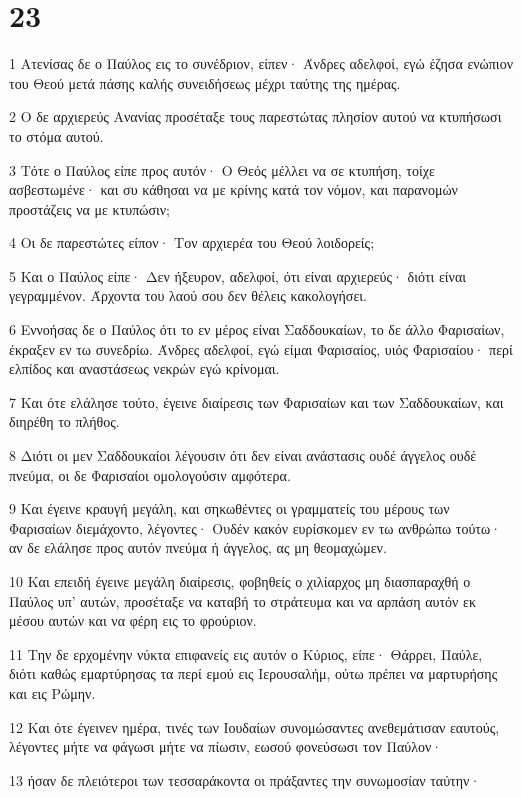 \chapter{23}

\par 1 Ατενίσας δε ο Παύλος εις το συνέδριον, είπεν· Άνδρες αδελφοί, εγώ έζησα ενώπιον του Θεού μετά πάσης καλής συνειδήσεως μέχρι ταύτης της ημέρας.
\par 2 Ο δε αρχιερεύς Ανανίας προσέταξε τους παρεστώτας πλησίον αυτού να κτυπήσωσι το στόμα αυτού.
\par 3 Τότε ο Παύλος είπε προς αυτόν· Ο Θεός μέλλει να σε κτυπήση, τοίχε ασβεστωμένε· και συ κάθησαι να με κρίνης κατά τον νόμον, και παρανομών προστάζεις να με κτυπώσιν;
\par 4 Οι δε παρεστώτες είπον· Τον αρχιερέα του Θεού λοιδορείς;
\par 5 Και ο Παύλος είπε· Δεν ήξευρον, αδελφοί, ότι είναι αρχιερεύς· διότι είναι γεγραμμένον. Άρχοντα του λαού σου δεν θέλεις κακολογήσει.
\par 6 Εννοήσας δε ο Παύλος ότι το εν μέρος είναι Σαδδουκαίων, το δε άλλο Φαρισαίων, έκραξεν εν τω συνεδρίω. Άνδρες αδελφοί, εγώ είμαι Φαρισαίος, υιός Φαρισαίου· περί ελπίδος και αναστάσεως νεκρών εγώ κρίνομαι.
\par 7 Και ότε ελάλησε τούτο, έγεινε διαίρεσις των Φαρισαίων και των Σαδδουκαίων, και διηρέθη το πλήθος.
\par 8 Διότι οι μεν Σαδδουκαίοι λέγουσιν ότι δεν είναι ανάστασις ουδέ άγγελος ουδέ πνεύμα, οι δε Φαρισαίοι ομολογούσιν αμφότερα.
\par 9 Και έγεινε κραυγή μεγάλη, και σηκωθέντες οι γραμματείς του μέρους των Φαρισαίων διεμάχοντο, λέγοντες· Ουδέν κακόν ευρίσκομεν εν τω ανθρώπω τούτω· αν δε ελάλησε προς αυτόν πνεύμα ή άγγελος, ας μη θεομαχώμεν.
\par 10 Και επειδή έγεινε μεγάλη διαίρεσις, φοβηθείς ο χιλίαρχος μη διασπαραχθή ο Παύλος υπ' αυτών, προσέταξε να καταβή το στράτευμα και να αρπάση αυτόν εκ μέσου αυτών και να φέρη εις το φρούριον.
\par 11 Την δε ερχομένην νύκτα επιφανείς εις αυτόν ο Κύριος, είπε· Θάρρει, Παύλε, διότι καθώς εμαρτύρησας τα περί εμού εις Ιερουσαλήμ, ούτω πρέπει να μαρτυρήσης και εις Ρώμην.
\par 12 Και ότε έγεινεν ημέρα, τινές των Ιουδαίων συνομώσαντες ανεθεμάτισαν εαυτούς, λέγοντες μήτε να φάγωσι μήτε να πίωσιν, εωσού φονεύσωσι τον Παύλον·
\par 13 ήσαν δε πλειότεροι των τεσσαράκοντα οι πράξαντες την συνωμοσίαν ταύτην·
